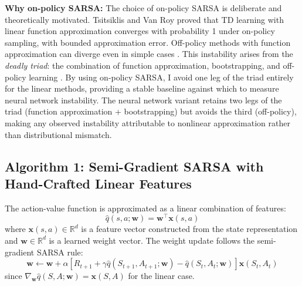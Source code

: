 \documentclass[11pt]{article}
\begin{document}
\textbf{Why on-policy SARSA:} The choice of on-policy SARSA is deliberate and theoretically motivated. Tsitsiklis and Van Roy \citep{tsitsiklis1997analysis} proved that TD learning with linear function approximation converges with probability 1 under on-policy sampling, with bounded approximation error. Off-policy methods with function approximation can diverge even in simple cases \citep{baird1995residual}. This instability arises from the \emph{deadly triad}: the combination of function approximation, bootstrapping, and off-policy learning \citep{sutton2018reinforcement, vanhasselt2018deadly}. By using on-policy SARSA, I avoid one leg of the triad entirely for the linear methods, providing a stable baseline against which to measure neural network instability. The neural network variant retains two legs of the triad (function approximation + bootstrapping) but avoids the third (off-policy), making any observed instability attributable to nonlinear approximation rather than distributional mismatch.

\subsection{Algorithm 1: Semi-Gradient SARSA with Hand-Crafted Linear Features}

The action-value function is approximated as a linear combination of features:
\begin{equation}
    \hat{q}(s, a; \mathbf{w}) = \mathbf{w}^\top \mathbf{x}(s, a)
\end{equation}
where $\mathbf{x}(s, a) \in \mathbb{R}^d$ is a feature vector constructed from the state representation and $\mathbf{w} \in \mathbb{R}^d$ is a learned weight vector. The weight update follows the semi-gradient SARSA rule:
\begin{equation}
    \mathbf{w} \leftarrow \mathbf{w} + \alpha \left[ R_{t+1} + \gamma \hat{q}(S_{t+1}, A_{t+1}; \mathbf{w}) - \hat{q}(S_t, A_t; \mathbf{w}) \right] \mathbf{x}(S_t, A_t)
\end{equation}
since $\nabla_{\mathbf{w}} \hat{q}(S, A; \mathbf{w}) = \mathbf{x}(S, A)$ for the linear case.
\end{document}
